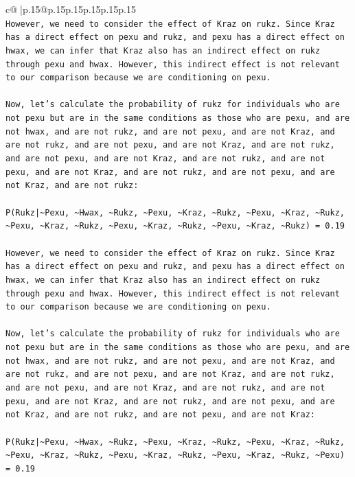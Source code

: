 \documentclass{article}
\begin{document}
{\begin{supertabular}{c@{$\;$}|p{.15\linewidth}@{}p{.15\linewidth}p{.15\linewidth}p{.15\linewidth}p{.15\linewidth}p{.15\linewidth}}
{{{\\ 
\texttt{However, we need to consider the effect of Kraz on rukz. Since Kraz has a direct effect on pexu and rukz, and pexu has a direct effect on hwax, we can infer that Kraz also has an indirect effect on rukz through pexu and hwax. However, this indirect effect is not relevant to our comparison because we are conditioning on pexu.} \\
\\ 
\texttt{Now, let's calculate the probability of rukz for individuals who are not pexu but are in the same conditions as those who are pexu, and are not hwax, and are not rukz, and are not pexu, and are not Kraz, and are not rukz, and are not pexu, and are not Kraz, and are not rukz, and are not pexu, and are not Kraz, and are not rukz, and are not pexu, and are not Kraz, and are not rukz, and are not pexu, and are not Kraz, and are not rukz:} \\
\\ 
\texttt{P(Rukz|\textasciitilde{}Pexu, \textasciitilde{}Hwax, \textasciitilde{}Rukz, \textasciitilde{}Pexu, \textasciitilde{}Kraz, \textasciitilde{}Rukz, \textasciitilde{}Pexu, \textasciitilde{}Kraz, \textasciitilde{}Rukz, \textasciitilde{}Pexu, \textasciitilde{}Kraz, \textasciitilde{}Rukz, \textasciitilde{}Pexu, \textasciitilde{}Kraz, \textasciitilde{}Rukz, \textasciitilde{}Pexu, \textasciitilde{}Kraz, \textasciitilde{}Rukz) = 0.19} \\
\\ 
\texttt{However, we need to consider the effect of Kraz on rukz. Since Kraz has a direct effect on pexu and rukz, and pexu has a direct effect on hwax, we can infer that Kraz also has an indirect effect on rukz through pexu and hwax. However, this indirect effect is not relevant to our comparison because we are conditioning on pexu.} \\
\\ 
\texttt{Now, let's calculate the probability of rukz for individuals who are not pexu but are in the same conditions as those who are pexu, and are not hwax, and are not rukz, and are not pexu, and are not Kraz, and are not rukz, and are not pexu, and are not Kraz, and are not rukz, and are not pexu, and are not Kraz, and are not rukz, and are not pexu, and are not Kraz, and are not rukz, and are not pexu, and are not Kraz, and are not rukz, and are not pexu, and are not Kraz:} \\
\\ 
\texttt{P(Rukz|\textasciitilde{}Pexu, \textasciitilde{}Hwax, \textasciitilde{}Rukz, \textasciitilde{}Pexu, \textasciitilde{}Kraz, \textasciitilde{}Rukz, \textasciitilde{}Pexu, \textasciitilde{}Kraz, \textasciitilde{}Rukz, \textasciitilde{}Pexu, \textasciitilde{}Kraz, \textasciitilde{}Rukz, \textasciitilde{}Pexu, \textasciitilde{}Kraz, \textasciitilde{}Rukz, \textasciitilde{}Pexu, \textasciitilde{}Kraz, \textasciitilde{}Rukz, \textasciitilde{}Pexu) = 0.19} \\
}}}
\end{supertabular}}
\end{document}
